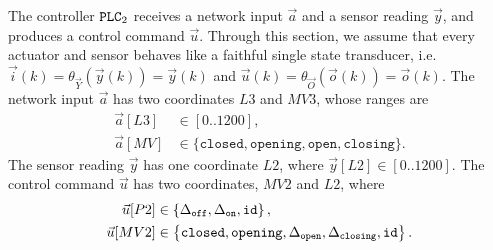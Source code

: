 {The controller $\texttt{PLC}_2$ receives a network input $\vec{a}$ and a sensor reading $\vec{y}$, and produces a control command $\vec{u}$. Through this section, we assume that every actuator and sensor behaves like a faithful single state transducer, i.e. $\vec{i}(k)=\theta_{\vec{Y}}(\vec{y}(k))=\vec{y}(k)$ and $\vec{u}(k)=\theta_{\vec{O}}(\vec{o}(k))=\vec{o}(k)$. 
The network input $\vec{a}$ has two coordinates $L3$ and $MV3$, whose ranges are 
\begin{align*}
  \vec{a}[L3]&\in[0..1200],\\ 
  \vec{a}[MV]&\in \{\texttt{closed},\texttt{opening},\texttt{open},\texttt{closing}\}.
\end{align*} 
The sensor reading $\vec{y}$ has one coordinate $L2$, where $\vec{y}[L2]\in[0..1200]$. 
The control command $\vec{u}$ has two coordinates, $MV2$ and $L2$, where 
\begin{align*}
  \vec{u}[P2]&\in\left\{{\Delta}_\texttt{off},{\Delta}_\texttt{on},{\texttt{id}}\right\},\\
  \vec{u}[MV2]&\in\left\{\texttt{closed},\texttt{opening},{\Delta}_\texttt{open},{\Delta}_\texttt{closing}, {\texttt{id}}\right\}.
\end{align*}

}
